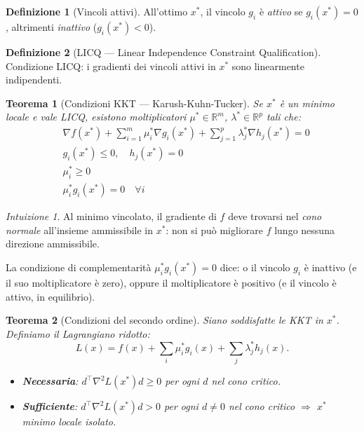 \documentclass[11pt, a4paper, twoside]{book}
\theoremstyle{definition}
\newtheorem{defn}{Definizione}[chapter]
\theoremstyle{plain}
\newtheorem{thm}{Teorema}[chapter]
\theoremstyle{remark}
\newtheorem{intuition}{Intuizione}[chapter]
\newcommand{\R}{\mathbb{R}}
\begin{document}
\begin{defn}[Vincoli attivi]
All'ottimo $x^*$, il vincolo $g_i$ è \emph{attivo} se $g_i(x^*) = 0$, altrimenti \emph{inattivo} ($g_i(x^*) < 0$).
\end{defn}

\begin{defn}[LICQ — Linear Independence Constraint Qualification]
Condizione LICQ: i gradienti dei vincoli attivi in $x^*$ sono linearmente indipendenti.
\end{defn}

\begin{thm}[Condizioni KKT — Karush-Kuhn-Tucker]
Se $x^*$ è un minimo locale e vale LICQ, esistono moltiplicatori $\mu^* \in \R^m$, $\lambda^* \in \R^p$ tali che:
\begin{align}
  &\nabla f(x^*) + \sum_{i=1}^m \mu_i^* \nabla g_i(x^*) + \sum_{j=1}^p \lambda_j^* \nabla h_j(x^*) = 0 \tag{stazionarietà} \\
  &g_i(x^*) \leq 0, \quad h_j(x^*) = 0 \tag{ammissibilità} \\
  &\mu_i^* \geq 0 \tag{non negatività} \\
  &\mu_i^* g_i(x^*) = 0 \quad \forall i \tag{complementarità}
\end{align}
\end{thm}

\begin{intuition}
Al minimo vincolato, il gradiente di $f$ deve trovarsi nel \emph{cono normale} all'insieme ammissibile in $x^*$: non si può migliorare $f$ lungo nessuna direzione ammissibile.

La condizione di complementarità $\mu_i^* g_i(x^*) = 0$ dice: o il vincolo $g_i$ è inattivo (e il suo moltiplicatore è zero), oppure il moltiplicatore è positivo (e il vincolo è attivo, in equilibrio).
\end{intuition}

\begin{thm}[Condizioni del secondo ordine]
Siano soddisfatte le KKT in $x^*$. Definiamo il \emph{Lagrangiano ridotto}:
\[
  L(x) = f(x) + \sum_i \mu_i^* g_i(x) + \sum_j \lambda_j^* h_j(x).
\]
\begin{itemize}
  \item \textbf{Necessaria}: $d^\top \nabla^2 L(x^*) d \geq 0$ per ogni $d$ nel cono critico.
  \item \textbf{Sufficiente}: $d^\top \nabla^2 L(x^*) d > 0$ per ogni $d \neq 0$ nel cono critico $\Rightarrow$ $x^*$ minimo locale isolato.
\end{itemize}
\end{thm}
\end{document}
